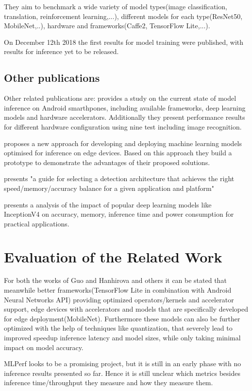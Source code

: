 They aim to benchmark a wide variety of model types(image classification, translation, reinforcement learning,...), different models for each type(ResNet50, MobileNet,..), hardware and frameworks(Caffe2, TensorFlow Lite,...).

On December 12th 2018 the first results for model training were published, with results for inference yet to be released.

\subsection{Other publications}
Other related publications are: 
\cite{DBLP:journals/corr/abs-1810-01109} provides a study on the current state of model inference on Android smarthpones, including available frameworks, deep learning models and hardware accelerators. Additionally they present performance results for different hardware configuration using nine test including image recognition.

\cite{rethinkingDeployment} proposes a new approach for developing and deploying machine learning models optimised for inference on edge devices. Based on this approach they build a prototype to demonstrate the advantages of their proposed solutions.


\cite{DBLP:journals/corr/HuangRSZKFFWSG016} presents "a guide for selecting a detection architecture that achieves the right
speed/memory/accuracy balance for a given application and platform"

\cite{DBLP:journals/corr/CanzianiPC16} presents a analysis of the impact of popular deep learning models like InceptionV4 on accuracy, memory, inference time and power consumption for practical applications.
\section{Evaluation of the Related Work}
For both the works of Guo\cite{DBLP:conf/ic2e/Guo18} and Hanhirova and others\cite{DBLP:conf/mmsys/HanhirovaKSSHY18} it can be stated that meanwhile better frameworks(TensorFlow Lite in combination with Android Neural Networks API) providing optimized operators/kernels and accelerator support, edge devices with accelerators and models that are specifically developed for edge deployment(MobileNet). Furthermore these models can also be further optimized with the help of techniques like quantization, that severely lead to improved speedup inference latency and model sizes, while only taking minimal impact on model accuracy.

MLPerf looks to be a promising project, but it is still in an early phase with no inference results presented so far. Hence it is still unclear which metrics besides inference time/throughput they measure and how they measure them.




 \endinput 
